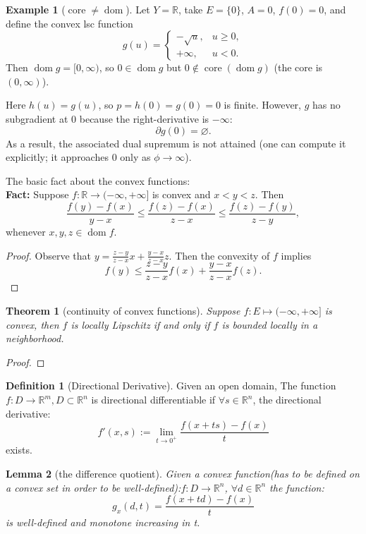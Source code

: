 \documentclass[a4paper,11pt,fleqn, draft]{book}
\newtheorem{theorem}{Theorem}[section]
\newtheorem{lemma}[theorem]{Lemma}
\theoremstyle{definition}
\newtheorem{definition}{Definition}[section]
\newtheorem*{example}{Example}
\theoremstyle{remark}
\newcommand{\R}{\mathbb{R}}
\DeclareMathOperator{\dom}{dom}
\begin{document}
\begin{example}[$\operatorname{core} \neq \operatorname{dom}$]
Let $Y=\mathbb{R}$, take $E=\{0\}$, $A=0$, $f(0)=0$, and define the convex lsc function
\[
g(u)=
\begin{cases}
-\sqrt{u}, & u\ge 0,\\
+\infty, & u<0.
\end{cases}
\]
Then $\operatorname{dom}g=[0,\infty)$, so $0\in\operatorname{dom}g$ but $0\notin\operatorname{core}(\operatorname{dom}g)$ (the core is $(0,\infty)$).

Here $h(u)=g(u)$, so $p=h(0)=g(0)=0$ is finite. However, $g$ has no subgradient at $0$ because the right-derivative is $-\infty$:
\[
\partial g(0)=\varnothing.
\]
As a result, the associated dual supremum is not attained (one can compute it explicitly; it approaches $0$ only as $\phi\to\infty$).
\end{example}

The basic fact about the convex functions:\\
\textbf{Fact:} Suppose $f : \R \to (-\infty, +\infty]$ is convex and $x < y < z$. Then
\[
	\frac{f(y) - f(x)}{y - x} \leq \frac{f(z) - f(x)}{z - x} \leq \frac{f(z) - f(y)}{z - y},
\]
whenever $x, y, z \in \dom f$.

\begin{proof}
Observe that $y = \frac{z-y}{z-x}x + \frac{y-x}{z-x}z$. Then the convexity of $f$ implies
\[
	f(y) \leq \frac{z-y}{z-x}f(x) + \frac{y-x}{z-x}f(z).
\]
\end{proof}

\begin{theorem}[continuity of convex functions]
Suppose $f: E \mapsto (-\infty, + \infty]$ is convex, then $f$ is locally Lipschitz if and only if $f$ is bounded locally in a neighborhood. 
\end{theorem}
\begin{proof}
\end{proof}

\begin{definition}[Directional Derivative]
	Given an open domain, The function $f:D \longrightarrow \mathbb{R}^m, D \subset \mathbb{R}^n$ is directional differentiable if $\forall s \in \mathbb{R}^n$, the directional derivative:
	\begin{equation}
		f'(x,s) := \lim_{t \rightarrow 0^+}\frac{f(x + ts) - f(x)}{t} 
	\end{equation}
 exists.
\end{definition}

\begin{lemma}[the difference quotient]
	Given a convex function(has to be defined on a convex set in order to be well-defined):$f: D \longrightarrow \mathbb{R}^n$, $\forall d \in \mathbb{R}^n$ the function:
	\begin{equation}
		g_x(d, t) = \frac{f(x + td) - f(x)}{t}
	\end{equation}
	is well-defined and monotone increasing in t.
\end{lemma}
\end{document}
